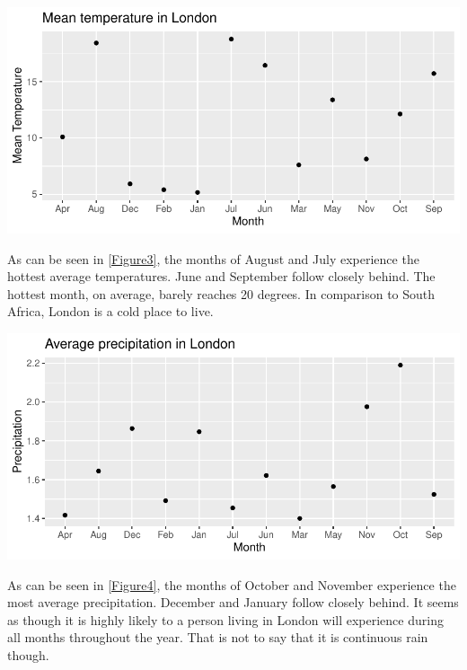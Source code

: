 \documentclass[11pt,preprint, authoryear]{elsarticle}
\let\origfigure\figure
\let\endorigfigure\endfigure
\renewenvironment{figure}[1][2] {
    \expandafter\origfigure\expandafter[H]
} {
    \endorigfigure
}
\numberwithin{equation}{section}
\numberwithin{figure}{section}
\numberwithin{table}{section}
\begin{document}
\begin{figure}[H]

{\centering \includegraphics{Question2_files/figure-latex/Figure3-1} 

}

\caption{Mean temperature \label{Figure3}}\label{fig:Figure3}
\end{figure}

As can be seen in \ref{Figure3}, the months of August and July
experience the hottest average temperatures. June and September follow
closely behind. The hottest month, on average, barely reaches 20
degrees. In comparison to South Africa, London is a cold place to live.

\begin{figure}[H]

{\centering \includegraphics{Question2_files/figure-latex/Figure4-1} 

}

\caption{Mean precipitation \label{Figure4}}\label{fig:Figure4}
\end{figure}

As can be seen in \ref{Figure4}, the months of October and November
experience the most average precipitation. December and January follow
closely behind. It seems as though it is highly likely to a person
living in London will experience during all months throughout the year.
That is not to say that it is continuous rain though.
\end{document}
